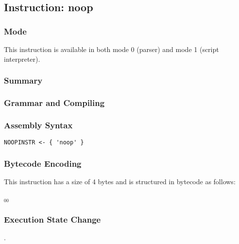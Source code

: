 \subsection{Instruction: noop}

\subsubsection{Mode}
This instruction is available in both mode 0 (parser) and mode 1 (script interpreter).
\subsubsection{Summary}


\subsubsection{Grammar and Compiling}


\subsubsection{Assembly Syntax}

\begin{myquote}
\begin{verbatim}
NOOPINSTR <- { 'noop' }
\end{verbatim}
\end{myquote}

\subsubsection{Bytecode Encoding}

This instruction has a size of 4 bytes and is structured in bytecode as follows:

$_{00}$\ 


\subsubsection{Execution State Change}

.


